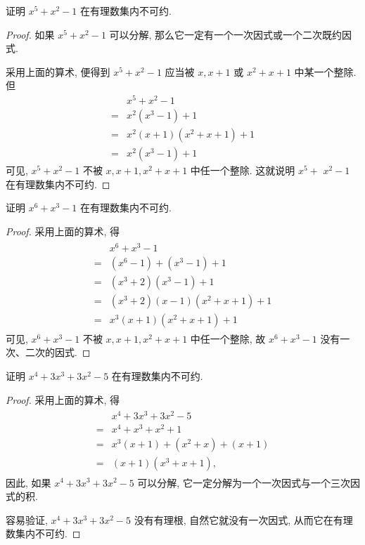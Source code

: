 \begin{example}
	证明 $x^{5}+x^{2}-1$ 在有理数集内不可约.
\end{example}
\begin{proof}
	如果 $x^{5}+x^{2}-1$ 可以分解, 那么它一定有一个一次因式或一个二次既约因式.

	采用上面的算术, 便得到 $x^{5}+x^{2}-1$ 应当被 $x ,  x+1$ 或 $x^{2}+x+1$ 中某一个整除. 但
	\begin{align*}
		  & x^{5}+x^{2}-1                      \\
		= & x^{2}\left(x^{3}-1\right)+1        \\
		= & x^{2}(x+1)\left(x^{2}+x+1\right)+1 \\
		= & x^{2}\left(x^{3}-1\right)+1
	\end{align*}
	可见,  $x^{5}+x^{2}-1$ 不被 $x ,  x+1 ,  x^{2}+x+1$ 中任一个整除. 这就说明 $x^{5}+$ $x^{2}-1$ 在有理数集内不可约.
\end{proof}

\begin{example}
	证明 $x^{6}+x^{3}-1$ 在有理数集内不可约.
\end{example}
\begin{proof}
	采用上面的算术, 得
	\begin{align*}
		\begin{aligned}
			  & x^{6}+x^{3}-1                                     \\
			= & \left(x^{6}-1\right)+\left(x^{3}-1\right)+1       \\
			= & \left(x^{3}+2\right)\left(x^{3}-1\right)+1        \\
			= & \left(x^{3}+2\right)(x-1)\left(x^{2}+x+1\right)+1 \\
			= & x^{3}(x+1)\left(x^{2}+x+1\right)+1
		\end{aligned}
	\end{align*}
	可见,  $x^{6}+x^{3}-1$ 不被 $x ,  x+1 ,  x^{2}+x+1$ 中任一个整除, 故 $x^{6}+x^{3}-1$ 没有一次、二次的因式.
\end{proof}

\begin{example}
	证明 $x^{4}+3 x^{3}+3 x^{2}-5$ 在有理数集内不可约.
\end{example}
\begin{proof}
	采用上面的算术, 得
	\begin{align*}
		\begin{aligned}
			  & x^{4}+3 x^{3}+3 x^{2}-5               \\
			= & x^{4}+x^{3}+x^{2}+1                   \\
			= & x^{3}(x+1)+\left(x^{2}+x\right)+(x+1) \\
			= & (x+1)\left(x^{3}+x+1\right),
		\end{aligned}
	\end{align*}
	因此, 如果 $x^{4}+3 x^{3}+3 x^{2}-5$ 可以分解, 它一定分解为一个一次因式与一个三次因式的积.

	容易验证,  $x^{4}+3 x^{3}+3 x^{2}-5$ 没有有理根, 自然它就没有一次因式, 从而它在有理数集内不可约.
\end{proof}



